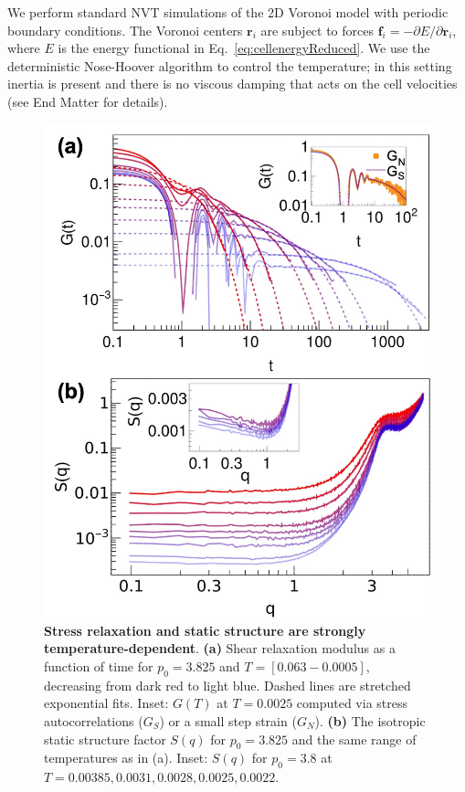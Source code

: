 \documentclass[aps,reprint,superscriptaddress,nofootinbib, notitlepage,prl]{revtex4-2}
\begin{document}

We perform standard NVT simulations of the 2D Voronoi model with periodic boundary conditions.
The Voronoi centers $\bm{r}_i$ are subject to forces $\bm{f}_i=-\partial E/\partial\bm{r}_i$, where $E$ is the energy functional in Eq.~\eqref{eq:cellenergyReduced}.
We use the deterministic Nose-Hoover algorithm to control the temperature; in this setting inertia is present and there is no viscous damping that acts on the cell velocities (see End Matter for details).

\begin{figure}[h]
	\centering
	\includegraphics[width=1\linewidth]{GtSq.jpg}
	\caption{\textbf{Stress relaxation and static structure are strongly temperature-dependent}. 
		\textbf{(a)} Shear relaxation modulus as a function of time for $p_0=3.825$ and $T=\left[0.063 - 0.0005\right]$, decreasing from dark red to light blue.
		Dashed lines are stretched exponential fits.
		Inset: $G(T)$ at $T=0.0025$ computed via stress autocorrelations ($G_S$) or a small step strain ($G_N$).
		\textbf{(b)} The isotropic static structure factor $S(q)$ for $p_0=3.825$ and the same range of temperatures as in (a). 
		Inset: $S(q)$ for $p_0=3.8$ at $T=0.00385, 0.0031, 0.0028, 0.0025, 0.0022$.
	}
	\label{fig:GtSq}
\end{figure}
\end{document}
